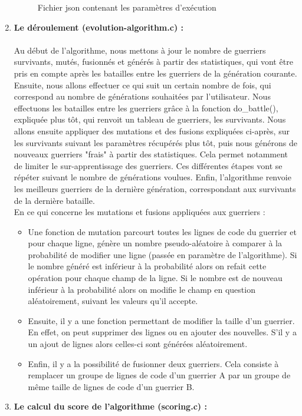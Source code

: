 \documentclass[french]{article}
\begin{document}
\begin{enumerate}
\begin{figure}[!h]
                        \caption{Fichier json contenant les paramètres d'exécution}
                    \end{figure}
                    
                
                \newpage
                \item \textbf {Le déroulement (evolution-algorithm.c) :}
                    \paragraph{}Au début de l'algorithme, nous mettons à jour le nombre de guerriers survivants, mutés, fusionnés et générés à partir des statistiques, qui vont être pris en compte après les batailles entre les guerriers de la génération courante. Ensuite, nous allons effectuer ce qui suit un certain nombre de fois, qui correspond au nombre de générations souhaitées par l'utilisateur. Nous effectuons les batailles entre les guerriers grâce à la fonction do\_battle(), expliquée plus tôt, qui renvoit un tableau de guerriers, les survivants. Nous allons ensuite appliquer des mutations et des fusions expliquées ci-après, sur les survivants suivant les paramètres récupérés plus tôt, puis nous générons de nouveaux guerriers "frais" à partir des statistiques. Cela permet notamment de limiter le sur-apprentissage des guerriers. Ces différentes étapes vont se répéter suivant le nombre de générations voulues. Enfin, l'algorithme renvoie les meilleurs guerriers de la dernière génération, correspondant aux survivants de la dernière bataille.
                    \\
                    
                    En ce qui concerne les mutations et fusions appliquées aux guerriers : \begin{itemize}
                        \item Une fonction de mutation parcourt toutes les lignes de code du guerrier et pour chaque ligne, génère un nombre pseudo-aléatoire à comparer à la probabilité de modifier une ligne (passée en paramètre de l'algorithme). Si le nombre généré est inférieur à la probabilité alors on refait cette opération pour chaque champ de la ligne. Si le nombre est de nouveau inférieur à la probabilité alors on modifie le champ en question aléatoirement, suivant les valeurs qu'il accepte.
                        \item Ensuite, il y a une fonction permettant de modifier la taille d'un guerrier. En effet, on peut supprimer des lignes ou en ajouter des nouvelles. S'il y a un ajout de lignes alors celles-ci sont générées aléatoirement.
                        \item Enfin, il y a la possibilité de fusionner deux guerriers. Cela consiste à remplacer un groupe de lignes de code d'un guerrier A par un groupe de même taille de lignes de code d'un guerrier B.
                    \end{itemize}
                    \bigskip
                \item \textbf{Le calcul du score de l'algorithme (scoring.c) :}

\end{enumerate}
\end{document}
